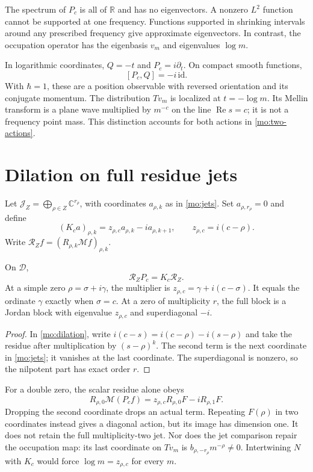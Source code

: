 The spectrum of $P_c$ is all of $\mathbb R$ and has no eigenvectors.
A nonzero $L^2$ function cannot be supported at one frequency.
Functions supported in shrinking intervals around any prescribed
frequency give approximate eigenvectors. In contrast, the
occupation operator has the eigenbasis $v_m$ and eigenvalues
$\log m$.

In logarithmic coordinates, $Q=-t$ and $P_c=i\partial_t$.
On compact smooth functions,
\[
 [P_c,Q]=-i\,\mathrm{id}.
\]
With $\hbar=1$, these are a position observable with reversed
orientation and its conjugate momentum. The distribution $Tv_m$
is localized at $t=-\log m$. Its Mellin transform is a plane
wave multiplied by $m^{-c}$ on the line $\operatorname{Re}s=c$;
it is not a frequency point mass. This distinction accounts for
both actions in \eqref{mo:two-actions}.

\section{Dilation on full residue jets}

Let $\mathscr J_Z=\bigoplus_{\rho\in Z}\mathbb C^{r_\rho}$,
with coordinates $a_{\rho,k}$ as in \eqref{mo:jets}. Set
$a_{\rho,r_\rho}=0$ and define
\begin{equation}
 (K_ca)_{\rho,k}=z_{\rho,c}a_{\rho,k}-i a_{\rho,k+1},
 \qquad z_{\rho,c}=i(c-\rho).
 \label{mo:jet-generator}
\end{equation}
Write $\mathcal R_Zf=(R_{\rho,k}\mathcal Mf)_{\rho,k}$.

\begin{proposition}
\label{mo:jet-comparison}
On $\mathscr D$,
\[
 \mathcal R_ZP_c=K_c\mathcal R_Z.
\]
At a simple zero $\rho=\sigma+i\gamma$, the multiplier is
$z_{\rho,c}=\gamma+i(c-\sigma)$. It equals the ordinate
$\gamma$ exactly when $\sigma=c$. At a zero of multiplicity
$r$, the full block is a Jordan block with eigenvalue $z_{\rho,c}$
and superdiagonal $-i$.
\end{proposition}
\begin{proof}
In \eqref{mo:dilation}, write
$i(c-s)=i(c-\rho)-i(s-\rho)$ and take the residue after
multiplication by $(s-\rho)^k$. The second term is the next
coordinate in \eqref{mo:jets}; it vanishes at the last coordinate.
The superdiagonal is nonzero, so the nilpotent part has exact
order $r$.
\end{proof}

For a double zero, the scalar residue alone obeys
\[
 R_{\rho,0}\mathcal M(P_cf)=
 z_{\rho,c}R_{\rho,0}F-iR_{\rho,1}F.
\]
Dropping the second coordinate drops an actual term. Repeating
$F(\rho)$ in two coordinates instead gives a diagonal action, but
its image has dimension one. It does not retain the full
multiplicity-two jet. Nor does the jet comparison repair the
occupation map: its last coordinate on $Tv_m$ is
$b_{\rho,-r_\rho}m^{-\rho}\ne0$. Intertwining $N$ with $K_c$
would force $\log m=z_{\rho,c}$ for every $m$.
